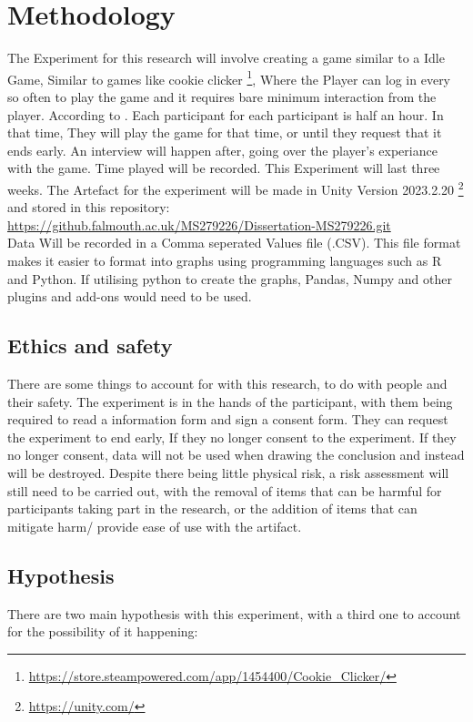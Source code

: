 \documentclass[conference]{IEEEtran}
\begin{document}
\section{Methodology}
The Experiment for this research will involve creating a game similar to a Idle Game, Similar to games like cookie clicker \footnote{\url {https://store.steampowered.com/app/1454400/Cookie_Clicker/}}, Where the Player can log in every so often to play the game and it requires bare minimum interaction from the player. According to \cite{Hwang2024}. Each participant for each participant  is half an hour. In that time, They will play the game for that time, or until they request that it ends early. An interview will happen after, going over the player's experiance with the game. Time played will be recorded. This Experiment will last three weeks. The Artefact for the experiment will be made in Unity Version 2023.2.20 \footnote{\url {https://unity.com/}} and stored in this repository:\\

\url{https://github.falmouth.ac.uk/MS279226/Dissertation-MS279226.git}\\

Data Will be recorded in a Comma seperated Values file (.CSV). This file format makes it easier to format into graphs using programming languages such as R and Python. If utilising python to create the graphs, Pandas, Numpy and other plugins and add-ons would need to be used.

\subsection{Ethics and safety}
There are some things to account for with this research, to do with people and their safety. The experiment is in the hands of the participant, with them being required to read a information form and sign a consent form. They can request the experiment to end early, If they no longer consent to the experiment.  If they no longer consent, data will not be used when drawing the conclusion and instead will be destroyed. Despite there being little physical risk, a risk assessment will still need to be carried out, with the removal of items that can be harmful for participants taking part in the research, or the addition of items that can mitigate harm/ provide ease of use with the artifact.\\
  
\subsection {Hypothesis}
There are two main hypothesis with this experiment, with a third one to account for the possibility of it happening:
\end{document}

